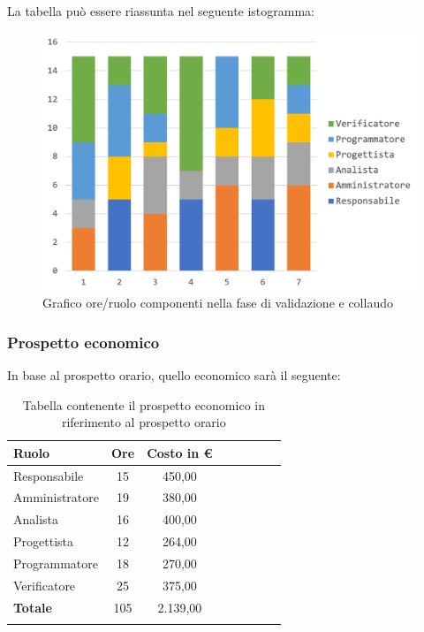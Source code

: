 		La tabella può essere riassunta nel seguente istogramma:
		\begin{figure}[H]
			\centering
			\includegraphics[width=0.8\linewidth]{./images/preventivo/validColl1.png}
			\caption{Grafico ore/ruolo componenti nella fase di validazione e collaudo}
			\label{fig:grafico suddivione ruoli fase di validazione e collaudo}
		\end{figure}
		
		\subsubsection{Prospetto economico}
		In base al prospetto orario, quello economico sarà il seguente: 
		
		\begin{longtable}{|l|c|c|c|c|c|c|c|}
			\hline
			\rowcolor{lighter-grayer}
			\textbf{Ruolo} & \textbf{Ore} & \textbf{Costo in € } \\
			\hline
			\endfirsthead
			
			\hline
			Responsabile 	    & 15 & 450,00\\
			\hline 
			\hline
			Amministratore	   & 19 & 380,00\\
			\hline
			\hline
			Analista 				& 16 & 400,00\\
			\hline
			\hline
			Progettista 		   & 12 & 264,00\\
			\hline
			\hline
			Programmatore 	  & 18 & 270,00\\
			\hline
			\hline
			Verificatore 		   & 25 & 375,00\\
			\hline
			\textbf{Totale} 	 & 105 & 2.139,00\\
			\hline
			\caption{Tabella contenente il prospetto economico in riferimento al prospetto orario}
		\end{longtable}
		\pagebreak
		
